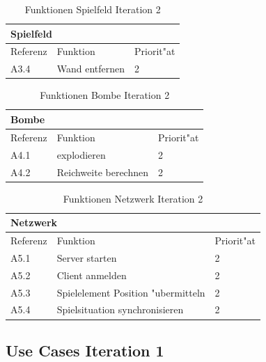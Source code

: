 \begin{table}[H]
  \begin{center}
    \begin{tabular}{|p{20mm}|p{85mm}|p{20mm}|}
    \multicolumn{3}{l}{\textbf{Spielfeld}} \\
    \hline Referenz & Funktion & Priorit"at \\
    \hline A3.4 & Wand entfernen & 2 \\
    \hline
    \end{tabular}
  \end{center}
  \caption{Funktionen Spielfeld Iteration 2}
\end{table}



\begin{table}[H]
  \begin{center}
    \begin{tabular}{|p{20mm}|p{85mm}|p{20mm}|}
    \multicolumn{3}{l}{\textbf{Bombe}} \\
    \hline Referenz & Funktion & Priorit"at \\
    \hline A4.1 & explodieren & 2 \\
    \hline A4.2 & Reichweite berechnen & 2 \\
    \hline
    \end{tabular}
  \end{center}
  \caption{Funktionen Bombe Iteration 2}
\end{table}



\begin{table}[H]
  \begin{center}
    \begin{tabular}{|p{20mm}|p{85mm}|p{20mm}|}
    \multicolumn{3}{l}{\textbf{Netzwerk}} \\
    \hline Referenz & Funktion & Priorit"at \\
    \hline A5.1 & Server starten & 2 \\
    \hline A5.2 & Client anmelden & 2 \\
    \hline A5.3 & Spielelement Position "ubermitteln & 2 \\
    \hline A5.4 & Spielsituation synchronisieren & 2 \\
    \hline
    \end{tabular}
  \end{center}
  \caption{Funktionen Netzwerk Iteration 2}
\end{table}

\subsection{Use Cases Iteration 1}
